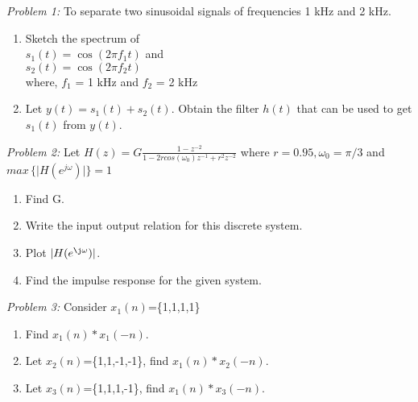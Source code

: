\documentclass[12pt,onecolumn]{IEEEtran}
\theoremstyle{definition}
\theoremstyle{remark}
\providecommand{\abs}[1]{\lvert#1\rvert}
\providecommand{\brak}[1]{\ensuremath{\left(#1\right)}}
\begin{document}
\title{
}
\maketitle
\vspace{-1cm}
\textit{Problem 1:}  To separate two sinusoidal signals of frequencies 1 kHz and 2 kHz.
\begin{enumerate}
\item Sketch the spectrum of 
\\
$s_1(t)=\cos\brak{2\pi f_1t}$ and
\\ 
$s_2(t)=\cos\brak{2\pi f_2t}$ 
\\
where, $f_1$ = 1 kHz  and $f_2$ = 2 kHz
\item Let $y(t)=s_1(t)+s_2(t)$.
 Obtain the filter $h(t)$ that can be used to get $s_1(t)$ from $y(t)$.
\end{enumerate}
\vspace{1cm}
\textit{Problem 2:} Let $H(z)=G\frac{1-z^{-2}}{1-2rcos(\omega_0)z^{-1}+r^2z^{-2}}$
where $r=0.95, \omega_0=\pi/3$ and $max \,\{ \abs{H(e^{j\omega})}\}=1$
\begin{enumerate}
\item Find G.
\item Write the input output relation for this discrete system.
\item Plot $\abs{H(e^{\j\omega})}$.
\item Find the impulse response for the given system.
\end{enumerate}
\vspace{1cm}
\textit{Problem 3:} Consider $x_1(n)$=\{1,1,1,1\}
\begin{enumerate}
\item Find $x_1(n)*x_1(-n)$.
\item Let $x_2(n)$=\{1,1,-1,-1\},
find $x_1(n)*x_2(-n)$.
\item Let $x_3(n)$=\{1,1,1,-1\},
find $x_1(n)*x_3(-n)$.
\end{enumerate} 
%
%
\end{document}
